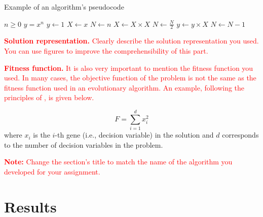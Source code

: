 \documentclass{scrartcl}
\begin{document}
\begin{algorithm}
\caption{Example of an algorithm's pseudocode}\label{alg:pseudocode_example}
\begin{algorithmic}
\Require $n \geq 0$
\Ensure $y = x^n$
\State $y \gets 1$
\State $X \gets x$
\State $N \gets n$
    \State $X \gets X \times X$
    \State $N \gets \frac{N}{2}$  
    \State $y \gets y \times X$
    \State $N \gets N - 1$
\EndIf
\EndWhile
\end{algorithmic}
\end{algorithm}

\textcolor{red}{\textbf{Solution representation.} Clearly describe the solution representation you used. You can use figures to improve the comprehensibility of this part.}

\textcolor{red}{\textbf{Fitness function.} It is also very important to mention the fitness function you used. In many cases, the objective function of the problem is not the same as the fitness function used in an evolutionary algorithm. An example, following the principles of \cite{zobel2014mathematics}, is given below.}

\begin{equation}
    F = \sum_{i=1}^d x_i^2 
\end{equation}
where $x_i$ is the $i$-th gene (i.e., decision variable) in the solution and $d$ corresponds to the number of decision variables in the problem.

\textcolor{red}{\textbf{Note:} Change the section's title to match the name of the algorithm you developed for your assignment.}

\lipsum[3]



\section{Results}






\end{document}
